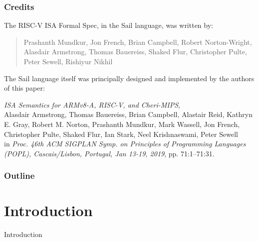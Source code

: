 \documentclass[aspectratio=169]{beamer}
\newcommand{\slidefont}{\scriptsize}
\begin{document}
\begin{frame}
  \frametitle{Credits}

  \slidefont

  The RISC-V ISA Formal Spec, in the Sail language, was written by:

  \begin{quote}
    Prashanth Mundkur,
    Jon French,
    Brian Campbell,
    Robert Norton-Wright,
    Alasdair Armstrong,
    Thomas Bauereiss,
    Shaked Flur,
    Christopher Pulte,
    Peter Sewell,
    Rishiyur Nikhil
  \end{quote}

  \vspace{4ex}

  The Sail language itself was principally designed and implemented by
  the authors of this paper:

  \vspace{1ex}

  \hfill \begin{minipage}{0.95\textwidth}
    \emph{ISA Semantics for ARMv8-A, RISC-V, and Cheri-MIPS}, \\
    Alasdair Armstrong,
    Thomas Bauereiss,
    Brian Campbell,
    Alastair Reid,
    Kathryn E. Gray,
    Robert M. Norton,
    Prashanth Mundkur,
    Mark Wassell,
    Jon French,
    Christopher Pulte,
    Shaked Flur,
    Ian Stark,
    Neel Krishnaswami,
    Peter Sewell \\
    in \emph{Proc. 46th ACM SIGPLAN Symp. on Principles of Programming
    Languages (POPL), Cascais/Lisbon, Portugal, Jan 13-19, 2019},
    pp. 71:1--71:31.
  \end{minipage}

\end{frame}


\begin{frame}
  \frametitle{Outline}
  \tableofcontents
\end{frame}


\section{Introduction}


\begin{frame}

  \slidefont

  \vfill

  \begin{center}\LARGE
    Introduction
  \end{center}

  \vfill

\end{frame}
\end{document}
